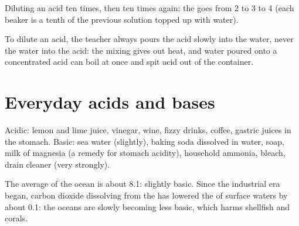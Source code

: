 \begin{omfigure}

{\small Diluting an acid ten times, then ten times again: the  goes from
2 to 3 to 4 (each beaker is a tenth of the previous solution topped up
with water).}
\end{omfigure}

\begin{inthelab}
To dilute an acid, the teacher always pours the acid slowly into the
water, never the water into the acid: the mixing gives out heat, and
water poured onto a concentrated acid can boil at once and spit acid
out of the container.
\end{inthelab}

\section{Everyday acids and bases}

\begin{proposition}\label{prop:g9:acids-bases-ph:everyday}
Acidic: lemon and lime juice, vinegar, wine, fizzy drinks, coffee,
gastric juices in the stomach. Basic: sea water (slightly), baking soda
dissolved in water, soap, milk of magnesia (a remedy for stomach
acidity), household ammonia, bleach, drain cleaner (very strongly).
\end{proposition}

\begin{example}\label{ex:g9:acids-bases-ph:ocean}
The average  of the ocean is about 8.1: slightly basic. Since the
industrial era began, carbon dioxide dissolving from the  has lowered
the  of surface waters by about 0.1: the oceans are slowly becoming
less basic, which harms shellfish and corals.
\end{example}

